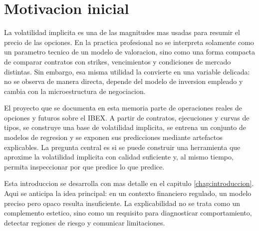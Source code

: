 \section*{Motivacion inicial}

La volatilidad implicita es una de las magnitudes mas usadas para resumir el precio de las opciones. En la practica profesional no se interpreta solamente como un parametro tecnico de un modelo de valoracion, sino como una forma compacta de comparar contratos con strikes, vencimientos y condiciones de mercado distintas. Sin embargo, esa misma utilidad la convierte en una variable delicada: no se observa de manera directa, depende del modelo de inversion empleado y cambia con la microestructura de negociacion.

El proyecto que se documenta en esta memoria parte de operaciones reales de opciones y futuros sobre el IBEX. A partir de contratos, ejecuciones y curvas de tipos, se construye una base de volatilidad implicita, se entrena un conjunto de modelos de regresion y se exponen sus predicciones mediante artefactos explicables. La pregunta central es si se puede construir una herramienta que aproxime la volatilidad implicita con calidad suficiente y, al mismo tiempo, permita inspeccionar por que predice lo que predice.

Esta introduccion se desarrolla con mas detalle en el capitulo \ref{chap:introduccion}. Aqui se anticipa la idea principal: en un contexto financiero regulado, un modelo preciso pero opaco resulta insuficiente. La explicabilidad no se trata como un complemento estetico, sino como un requisito para diagnosticar comportamiento, detectar regiones de riesgo y comunicar limitaciones.
